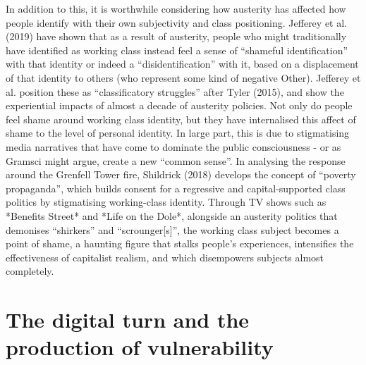 In addition to this, it is worthwhile considering how austerity has
affected how people identify with their own subjectivity and class
positioning. \citep{jeffery_classificatory_2019} Jefferey et al. (2019) have shown that as a result of
austerity, people who might traditionally have identified as working
class instead feel a sense of ``shameful identification'' with that
identity or indeed a ``disidentification'' with it, based on a
displacement of that identity to others (who represent some kind of
negative Other). Jefferey et al. position these as ``classificatory
struggles'' after Tyler (2015), and show the experiential impacts of
almost a decade of austerity policies. Not only do people feel shame
around working class identity, but they have internalised this affect of
shame to the level of personal identity. In large part, this is due to
stigmatising media narratives that have come to dominate the public
consciousness - or as Gramsci might argue, create a new ``common
sense''. In analysing the response around the Grenfell Tower fire,
Shildrick (2018) develops the concept of ``poverty propaganda'', which
builds consent for a regressive and capital-supported class politics by
stigmatising working-class identity. Through TV shows such as *Benefits
Street* and *Life on the Dole*, alongside an austerity politics that
demonises ``shirkers'' and ``scrounger{[}s{]}'', the working class
subject becomes a point of shame, a haunting figure that stalks people's
experiences, intensifies the effectiveness of capitalist realism, and
which disempowers subjects almost completely.

\section{The digital turn and the production of vulnerability }
\label{the-digital-turn-and-the-production-of-vulnerability}

